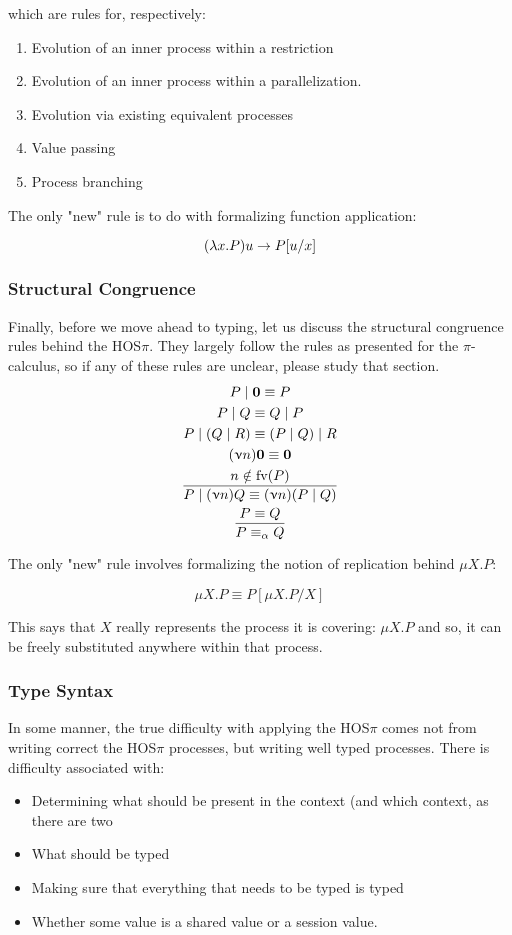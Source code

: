 which are rules for, respectively:
\begin{enumerate}
    \item Evolution of an inner process within a restriction
    \item Evolution of an inner process within a parallelization.
    \item Evolution via existing equivalent processes
    \item Value passing
    \item Process branching
\end{enumerate}

The only "new" rule is to do with formalizing function application:


$$
(\lambda x . P) u \rightarrow P [ u / x]
$$

\subsubsection{Structural Congruence}
Finally, before we move ahead to typing, let us discuss the structural congruence rules behind the HOS$\pi$. They largely follow the rules as presented for the $\pi$-calculus, so if any of these rules are unclear, please study that section.
\begin{gather*}
P \mid \textbf{0} \equiv P \\
P \mid Q \equiv Q \mid P \\
P \mid (Q \mid R) \equiv (P \mid Q) \mid R \\
(\upnu n) \textbf{0} \equiv \textbf{0} \\
\frac{n \notin \text{fv}(P)}{P \mid (\upnu n) Q \equiv (\upnu n)(P \mid Q)} \\
\frac{P \equiv Q}{P \equiv_\alpha Q}
\end{gather*}

The only "new" rule involves formalizing the notion of replication behind $\mu X . P$:

$$
\mu X . P \equiv P [\mu X . P/ X]
$$

This says that $X$ really represents the process it is covering: $\mu X . P$ and so, it can be freely substituted anywhere within that process.

\subsubsection{Type Syntax}

In some manner, the true difficulty with applying the HOS$\pi$ comes not from writing correct the HOS$\pi$ processes, but writing well typed processes. There is difficulty associated with:
\begin{itemize}
\item Determining what should be present in the context (and which context, as there are two
\item What should be typed
\item Making sure that everything that needs to be typed is typed
\item Whether some value is a shared value or a session value.
\end{itemize}

